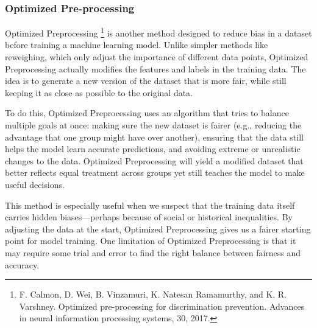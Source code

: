 \begin{VCSet}
    \begin{visualComponent}
    \end{visualComponent}
    
    \begin{visualComponent}
    \end{visualComponent}

    \begin{visualComponent}
    \end{visualComponent}
\end{VCSet}



\subsubsection{Optimized Pre-processing}
\par Optimized Preprocessing \footnote{F. Calmon, D. Wei, B. Vinzamuri, K. Natesan Ramamurthy, and K. R. Varshney. Optimized pre-processing for discrimination prevention. Advances in neural information processing systems, 30, 2017.} is another method designed to reduce bias in a dataset before training a machine learning model. Unlike simpler methods like reweighing, which only adjust the importance of different data points, Optimized Preprocessing actually modifies the features and labels in the training data. The idea is to generate a new version of the dataset that is more fair, while still keeping it as close as possible to the original data.  

\par To do this, Optimized Preprocessing uses an algorithm that tries to balance multiple goals at once: making sure the new dataset is fairer (e.g., reducing the advantage that one group might have over another), ensuring that the data still helps the model learn accurate predictions, and avoiding extreme or unrealistic changes to the data. Optimized Preprocessing will yield a modified dataset that better reflects equal treatment across groups yet still teaches the model to make useful decisions.

\par This method is especially useful when we suspect that the training data itself carries hidden biases—perhaps because of social or historical inequalities. By adjusting the data at the start, Optimized Preprocessing gives us a fairer starting point for model training. One limitation of Optimized Preprocessing is that it may require some trial and error to find the right balance between fairness and accuracy. 

